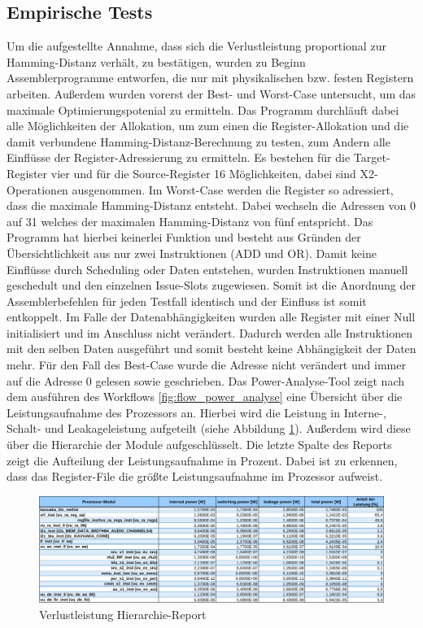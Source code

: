 \subsection{Empirische Tests}
\label{cap:empirischeTests}
Um die aufgestellte Annahme, dass sich die Verlustleistung proportional zur Hamming-Distanz verhält, zu bestätigen, wurden zu Beginn Assemblerprogramme entworfen, die nur mit physikalischen bzw. festen Registern arbeiten.
Außerdem wurden vorerst der Best- und Worst-Case untersucht, um das maximale Optimierungspotenial zu ermitteln. Das Programm durchläuft dabei alle Möglichkeiten der Allokation, um zum einen die Register-Allokation und die damit verbundene Hamming-Distanz-Berechnung zu testen, zum Andern alle Einflüsse der Register-Adressierung zu ermitteln. Es bestehen für die Target-Register vier und für die Source-Register 16 Möglichkeiten, dabei sind X2-Operationen ausgenommen. Im Worst-Case werden die Register so adressiert, dass die maximale Hamming-Distanz entsteht. Dabei wechseln die Adressen von 0 auf 31 welches der maximalen Hamming-Distanz von fünf entspricht. Das Programm hat hierbei keinerlei Funktion und besteht aus Gründen der Übersichtlichkeit aus nur zwei Instruktionen (ADD und OR). Damit keine Einflüsse durch Scheduling oder Daten entstehen, wurden Instruktionen manuell geschedult und den einzelnen Issue-Slots zugewiesen. Somit ist die Anordnung der Assemblerbefehlen für jeden Testfall identisch und der Einfluss ist somit entkoppelt. Im Falle der Datenabhängigkeiten wurden alle Register mit einer Null initialisiert und im Anschluss nicht verändert. Dadurch werden alle Instruktionen mit den selben Daten ausgeführt und somit besteht keine Abhängigkeit der Daten mehr.
Für den Fall des Best-Case wurde die Adresse nicht verändert und immer auf die Adresse 0 gelesen sowie geschrieben.
Das Power-Analyse-Tool zeigt nach dem ausführen des Workflows \ref{fig:flow_power_analyse} eine Übersicht über die Leistungsaufnahme des Prozessors an. Hierbei wird die Leistung in Interne-, Schalt- und Leakageleistung aufgeteilt (siehe Abbildung \ref{fig:best_hierarchy_report}). Außerdem wird diese über die Hierarchie der Module aufgeschlüsselt. Die letzte Spalte des Reports zeigt die Aufteilung der Leistungsaufnahme in Prozent. Dabei ist zu erkennen, dass das Register-File die größte Leistungsaufnahme im Prozessor aufweist.


	\begin{figure}[htbp] 
		\centering
		\includegraphics[width=\textwidth]{fig/best_hierarchy_report.pdf}
		\caption{Verlustleistung Hierarchie-Report}
		\label{fig:best_hierarchy_report}
	\end{figure}

